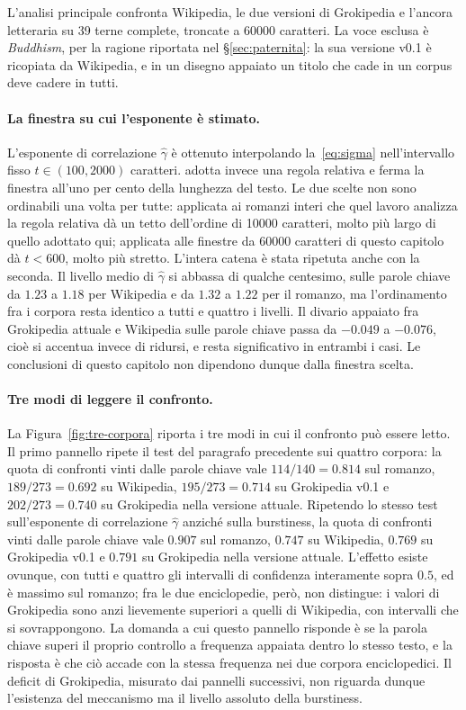 L'analisi principale confronta Wikipedia, le due versioni di Grokipedia e
l'ancora letteraria su \num{39} terne complete, troncate a \num{60000}
caratteri. La voce esclusa è \emph{Buddhism}, per la ragione riportata nel
§\ref{sec:paternita}: la sua versione v0.1 è ricopiata da Wikipedia, e in un
disegno appaiato un titolo che cade in un corpus deve cadere in tutti.

\paragraph{La finestra su cui l'esponente è stimato.}
L'esponente di correlazione $\hat\gamma$ è ottenuto interpolando
la~\eqref{eq:sigma} nell'intervallo fisso $t \in (100, 2000)$ caratteri.
\cite{altmann2012} adotta invece una regola relativa e ferma la finestra
all'uno per cento della lunghezza del testo. Le due scelte non sono ordinabili
una volta per tutte: applicata ai romanzi interi che quel lavoro analizza la
regola relativa dà un tetto dell'ordine di \num{10000} caratteri, molto più
largo di quello adottato qui; applicata alle finestre da \num{60000} caratteri
di questo capitolo dà $t < 600$, molto più stretto. L'intera catena è stata
ripetuta anche con la seconda. Il
livello medio di $\hat\gamma$ si abbassa di qualche centesimo, sulle parole
chiave da $1.23$ a $1.18$ per Wikipedia e da $1.32$ a $1.22$ per il romanzo,
ma l'ordinamento fra i corpora resta identico a tutti e quattro i livelli. Il
divario appaiato fra Grokipedia attuale e Wikipedia sulle parole chiave passa
da $-0.049$ a $-0.076$, cioè si accentua invece di ridursi, e resta
significativo in entrambi i casi. Le conclusioni di questo capitolo non
dipendono dunque dalla finestra scelta.

\paragraph{Tre modi di leggere il confronto.}
La Figura~\ref{fig:tre-corpora} riporta i tre modi in cui il confronto può
essere letto. Il primo pannello ripete il test del paragrafo precedente sui
quattro corpora: la quota di confronti vinti dalle parole chiave vale
$114/140 = 0.814$ sul romanzo, $189/273 = 0.692$ su Wikipedia,
$195/273 = 0.714$ su Grokipedia v0.1 e $202/273 = 0.740$ su Grokipedia nella
versione attuale. Ripetendo lo stesso test sull'esponente di correlazione
$\hat\gamma$ anziché sulla burstiness, la quota di confronti vinti dalle parole
chiave vale $0.907$ sul romanzo, $0.747$ su Wikipedia, $0.769$ su Grokipedia
v0.1 e $0.791$ su Grokipedia nella versione attuale.
L'effetto esiste ovunque, con tutti e quattro gli
intervalli di confidenza interamente sopra $0.5$, ed è massimo sul romanzo;
fra le due enciclopedie, però, non distingue: i valori di Grokipedia sono anzi
lievemente superiori a quelli di Wikipedia, con intervalli che si sovrappongono.
La domanda a cui questo pannello risponde è se la parola chiave superi il
proprio controllo a frequenza appaiata dentro lo stesso testo, e la
risposta è che ciò accade con la stessa frequenza nei due corpora enciclopedici.
Il deficit di Grokipedia, misurato dai pannelli successivi, non riguarda dunque
l'esistenza del meccanismo ma il livello assoluto della burstiness.

